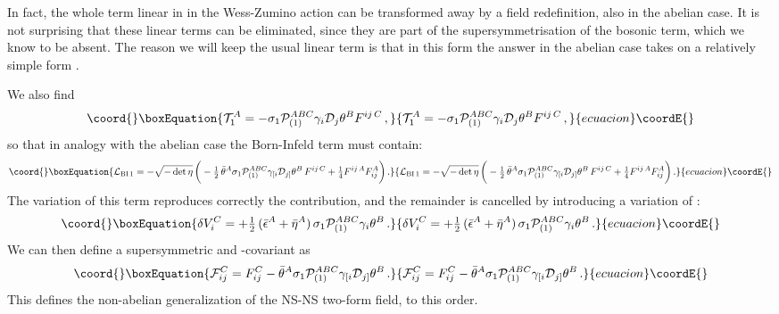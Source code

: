 \documentclass[12pt,a4paper]{article}
\def\half{{\textstyle {1 \over 2}}}
\def\noverm#1#2{{\textstyle {#1 \over #2}}}
\def\Dpartial{{\cal D}}
\begin{document}
In fact, the whole term linear in \coordHE{} in the Wess-Zumino action
can be transformed away by a field redefinition, also
in the abelian case. It is not surprising that
these linear terms can be eliminated, since they are
part of the supersymmetrisation of the bosonic \coordHE{} term,
which we know to be absent. The reason we will keep
the usual linear term is that in this form the answer
in the abelian case
takes on a relatively simple form \cite{Aga}.

We also find
\begin{equation}\coord{}\boxEquation{
  {\cal T}_1^A = -\sigma_1{\cal P}_{(1)}^{ABC}
   \gamma_i\Dpartial_j\theta^B F^{ij\,C}\,,
}{
  {\cal T}_1^A = -\sigma_1{\cal P}_{(1)}^{ABC}
   \gamma_i\Dpartial_j\theta^B F^{ij\,C}\,,
}{ecuacion}\coordE{}\end{equation}
so that
in analogy with the abelian case the Born-Infeld term must
contain:
\begin{equation}\coord{}\boxEquation{
\label{LBI1nab}
   {\cal L}_{{\rm BI\,1}} =   - \sqrt{-\det\eta}\,\bigg(
   - \half\, \bar\theta^A \sigma_1 {\cal P}_{(1)}^{ABC}
       \gamma_{[i}\Dpartial_{j]}\theta^B\, F^{ij\,C}
      + \noverm{1}{4} F^{ij\,A} F_{ij}^A \bigg)\,.
}{
{\cal L}_{{\rm BI\,1}} =   - \sqrt{-\det\eta}\,\bigg(
   - \half\, \bar\theta^A \sigma_1 {\cal P}_{(1)}^{ABC}
       \gamma_{[i}\Dpartial_{j]}\theta^B\, F^{ij\,C}
      + \noverm{1}{4} F^{ij\,A} F_{ij}^A \bigg)\,.
}{ecuacion}\coordE{}\end{equation}
The variation of this term reproduces correctly the \coordHE{}
contribution, and the remainder is cancelled by introducing
a variation of \coordHE{}:
\begin{equation}\coord{}\boxEquation{
   \delta V_i^C = + \half\,(\bar\epsilon^A+\bar\eta^A)\,
           \sigma_1{\cal P}_{(1)}^{ABC}\gamma_i\theta^B \,.
}{
   \delta V_i^C = + \half\,(\bar\epsilon^A+\bar\eta^A)\,
           \sigma_1{\cal P}_{(1)}^{ABC}\gamma_i\theta^B \,.
}{ecuacion}\coordE{}\end{equation}
We can then define a supersymmetric and \myHighlight{$\kappa$}\coordHE{}-covariant
\coordHE{} as
\begin{equation}\coord{}\boxEquation{
\label{calF}
  {\cal F}_{ij}^C = F_{ij}^C - \bar\theta^A \sigma_1 {\cal P}_{(1)}^{ABC}
                 \gamma_{[i}\Dpartial_{j]}\theta^B\,.
}{
{\cal F}_{ij}^C = F_{ij}^C - \bar\theta^A \sigma_1 {\cal P}_{(1)}^{ABC}
                 \gamma_{[i}\Dpartial_{j]}\theta^B\,.
}{ecuacion}\coordE{}\end{equation}
This defines the non-abelian generalization of the NS-NS two-form field,
to this order.
\end{document}
